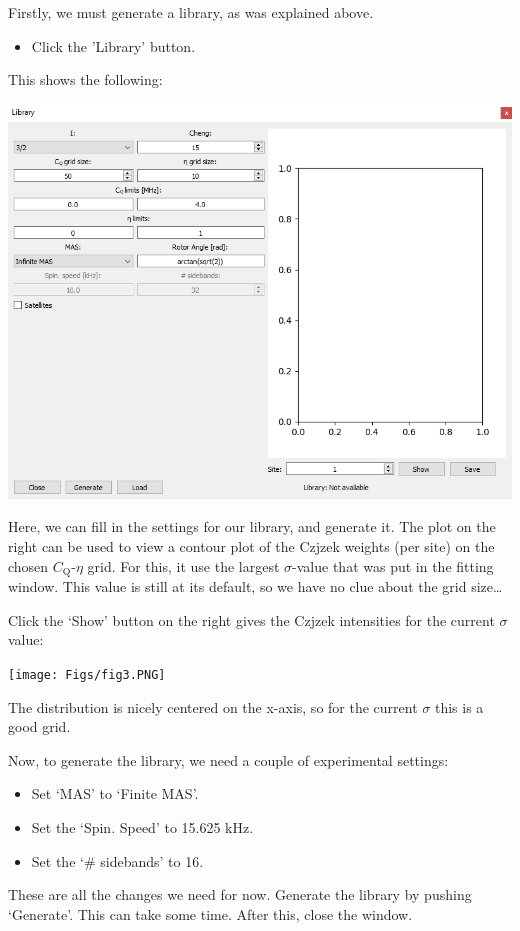 \documentclass[11pt,a4paper]{article}
\begin{document}
Firstly, we must generate a library, as was explained above.

\begin{itemize}
  \item Click the 'Library' button.
\end{itemize}
This shows the following:
\begin{center}
\includegraphics[width=0.8\linewidth]{Figs/fig2.PNG}
\end{center}
Here, we can fill in the settings for our library, and generate it. The plot on the right can be used to view a contour plot of the Czjzek weights (per site) on the chosen $C_\text{Q}$-$\eta$ grid. For this, it use the largest $\sigma$-value that was put in the fitting window. This value is still at its default, so we have no clue about the grid size\ldots

Click the `Show' button on the right gives the Czjzek intensities for the current $\sigma$ value:
\begin{center}
\texttt{[image: Figs/fig3.PNG]}
\end{center}

The distribution is nicely centered on the x-axis, so for the current $\sigma$ this is a good grid.

Now, to generate the library, we need a couple of experimental settings:
\begin{itemize}
  \item Set `MAS' to `Finite MAS'.
  \item Set the `Spin. Speed' to 15.625 kHz.
  \item Set the `\# sidebands' to 16.
\end{itemize}
These are all the changes we need for now. Generate the library by pushing `Generate'. This can take some time. After this, close the window.
\end{document}
